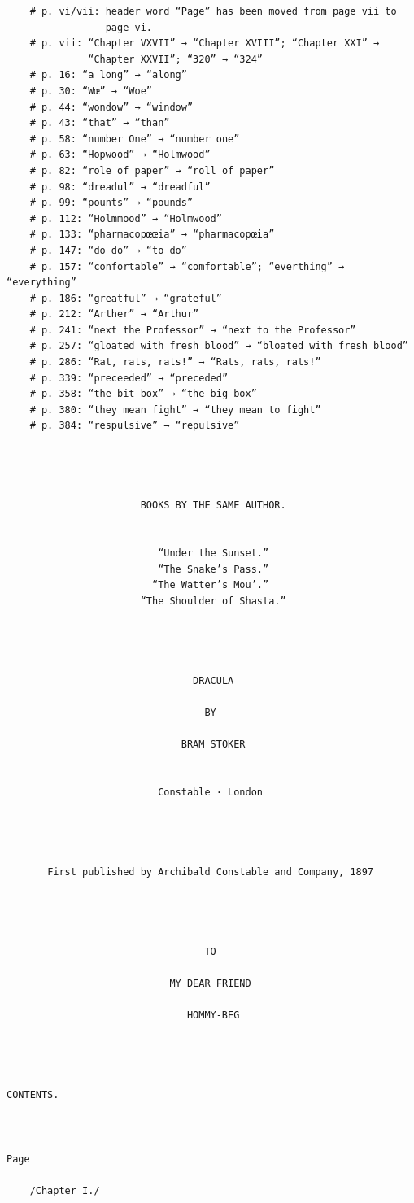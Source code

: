 \documentclass{article}
\begin{document}
\begin{verbatim}
    # p. vi/vii: header word “Page” has been moved from page vii to
                 page vi.
    # p. vii: “Chapter VXVII” → “Chapter XVIII”; “Chapter XXI” →
              “Chapter XXVII”; “320” → “324”
    # p. 16: “a long” → “along”
    # p. 30: “Wœ” → “Woe”
    # p. 44: “wondow” → “window”
    # p. 43: “that” → “than”
    # p. 58: “number One” → “number one”
    # p. 63: “Hopwood” → “Holmwood”
    # p. 82: “role of paper” → “roll of paper”
    # p. 98: “dreadul” → “dreadful”
    # p. 99: “pounts” → “pounds”
    # p. 112: “Holmmood” → “Holmwood”
    # p. 133: “pharmacopœœia” → “pharmacopœia”
    # p. 147: “do do” → “to do”
    # p. 157: “confortable” → “comfortable”; “everthing” → “everything”
    # p. 186: “greatful” → “grateful”
    # p. 212: “Arther” → “Arthur”
    # p. 241: “next the Professor” → “next to the Professor”
    # p. 257: “gloated with fresh blood” → “bloated with fresh blood”
    # p. 286: “Rat, rats, rats!” → “Rats, rats, rats!”
    # p. 339: “preceeded” → “preceded”
    # p. 358: “the bit box” → “the big box”
    # p. 380: “they mean fight” → “they mean to fight”
    # p. 384: “respulsive” → “repulsive”




                       BOOKS BY THE SAME AUTHOR.


                          “Under the Sunset.”
                          “The Snake’s Pass.”
                         “The Watter’s Mou’.”
                       “The Shoulder of Shasta.”




                                DRACULA

                                  BY

                              BRAM STOKER


                          Constable · London




       First published by Archibald Constable and Company, 1897




                                  TO

                            MY DEAR FRIEND

                               HOMMY-BEG




CONTENTS.


                                                                    Page

    /Chapter I./


\end{verbatim}
\end{document}
